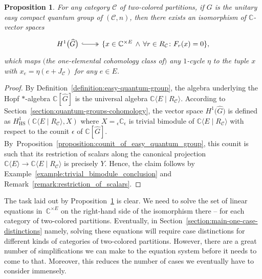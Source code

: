 \documentclass[10pt,a4paper]{amsart}
\numberwithin{equation}{section}
\newtheorem{Proposition}[Theorem]{Proposition}
{ \theoremstyle{definition}
\newtheorem{Definition}[Theorem]{Definition}
\newtheorem{Note}[Theorem]{Note}
\newtheorem{Example}[Theorem]{Example}
\newtheorem{Remark}[Theorem]{Remark}
\newtheorem{Notation}[Theorem]{Notation}
\newtheorem{Assumptions}[Theorem]{Assumptions}
}
\newcommand{\freealg}[2]{#1\langle #2\rangle}
\newcommand{\univalg}[3]{#1\langle #2 \classpredicate #3\rangle}
\newcommand{\HScohomology}[3]{H^{#1}_{\mathrm{HS}}(#2,#3)}
\newcommand{\thefuncxx}[2]{F_{#1}(#2)}
\newcommand{\Scounit}{\epsilon}
\newcommand{\Sand}{\,\wedge\,}
\newcommand{\classpredicate}{\mid}
\newcommand{\quantorpredicate}{\colon }
\newcommand{\comps}{\mathbb{C}}
\newcommand{\fromto}[2]{#1 \to #2}
\newcommand{\Sdirectproduct}{\times}
\newcommand{\Yc}[1]{\mathfrak{#1}}
\newcommand{\DQGgroupalgebra}[1]{\comps [#1 ]}
\newcommand{\DQGcohomologyTC}[2]{H^{#1} \bigl(#2 \bigr)}
\newcommand{\CQGdualC}[1]{\widehat{#1}}
\newcommand{\thedim}{n}
\newcommand{\theqg}{G}
\newcommand{\thegens}{E}
\newcommand{\therels}{R}
\newcommand{\thepartrels}[1]{\therels_{#1}}
\newcommand{\thecat}{\mathcal{C}}
\newcommand{\theideal}{J}
\newcommand{\thepartideal}[1]{\theideal_{#1}}
\newcommand{\themodule}{X}
\newcommand{\theresmodule}{Y}
\newcommand{\thecounit}{\Scounit}
\begin{document}
{
  \newcommand{\anygen}{e}
  \newcommand{\thepolys}{\freealg{\comps}{\thegens}}
  \newcommand{\somerel}{r}
  \newcommand{\indj}{j}
  \newcommand{\indi}{i}
  \newcommand{\incol}{\Yc{c}}
  \newcommand{\outcol}{\Yc{d}}
  \newcommand{\infree}{g}
  \newcommand{\outfree}{j}
  \newcommand{\thepartition}{p}
  \newcommand{\thetuple}{x}
  \newcommand{\thetuplex}[1]{x_{#1}}
  \newcommand{\somecocycle}{\eta}
  \begin{Proposition}
    \label{proposition:main_system_of_equations}
    For any category $\thecat$ of two-co\-lo\-red partitions,
    if $\theqg$ is the unitary easy compact quantum group of $(\thecat,\thedim)$,
then there exists an isomorphism of $\comps$-vector spaces
\[
  \begin{tikzcd}
  \DQGcohomologyTC{1}{\CQGdualC{\theqg}} \arrow[r, two heads, hook]& \{ \thetuple\in\comps^ {\Sdirectproduct\thegens}\Sand \forall  \somerel\in\thepartrels{\thecat}\quantorpredicate \thefuncxx{\somerel}{\thetuple}=0  \},
  \end{tikzcd}
\]
which maps $($the one-elemental cohomology class of$)$ any $1$-cycle $\somecocycle$ to the tuple $\thetuple$ with $\thetuplex{\anygen}=\somecocycle(\anygen+\thepartideal{\thecat})$ for any $\anygen\in\thegens$.
\end{Proposition}
\begin{proof}
  By Definition~\ref{definition:easy-quantum-group}, the algebra underlying the Hopf $\ast$-algebra $\DQGgroupalgebra{\CQGdualC{\theqg}}$ is the universal algebra $\univalg{\comps}{\thegens}{\thepartrels{\thecat}}$. According to Section~\ref{section:quantum-groups-cohomology}, the vector space $\DQGcohomologyTC{1}{\CQGdualC{\theqg}}$ is defined as $\HScohomology{1}{\univalg{\comps}{\thegens}{\thepartrels{\thecat}}}{\themodule}$ where  $\themodule={}_\thecounit\comps_\thecounit$ is trivial bimodule of $\univalg{\comps}{\thegens}{\thepartrels{\thecat}}$ with respect to the counit $\thecounit$ of $\DQGgroupalgebra{\CQGdualC{\theqg}}$. By~Pro\-po\-si\-tion~\ref{proposition:counit_of_easy_quantum_group}, this counit is such that its restriction of scalars along the canonical projection $\fromto{\thepolys}{\univalg{\comps}{\thegens}{\thepartrels{\thecat}}}$ is precisely $\theresmodule$. Hence, the claim follows by
  Example~\ref{example:trivial_bimodule_conclusion} and Remark~\ref{remark:restriction_of_scalars}.
\end{proof}
}
The task laid out by Pro\-po\-si\-tion~\ref{proposition:main_system_of_equations} is clear. We need to solve the set of linear equations in~$\comps^{\Sdirectproduct\thegens}$ on the right-hand side of the isomorphism there --  for each category of two-co\-lo\-red partitions. Eventually, in Section~\ref{section:main-one-case-distinctions}  namely, solving these equations will require case distinctions for different kinds of categories of two-co\-lo\-red partitions. However, there are a great number of simplifications we can make to the equation system before it needs to come to that. Moreover, this reduces the number of cases we eventually have to consider immensely.
\end{document}
